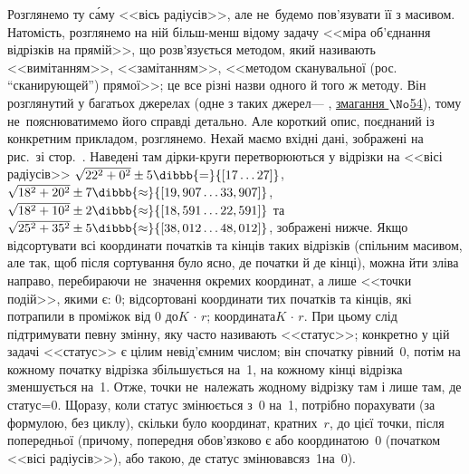 Розглянемо ту с\'{а}му <<вісь радіусів>>, але не~будемо пов'язувати її з масивом. Натомість, розглянемо на ній більш-менш відому задачу <<міра об'єднання відрізків на прямій>>, що розв'язується методом, який називають <<вимітанням>>, <<замітанням>>, <<методом сканувальної (рос. ``сканирующей'') прямої>>; це все різні назви одного й того ж методу. Він розглянутий у багатьох джерелах (одне з таких джерел\nolinebreak[3] --- \EjudgeCkipoName, \href{https://ejudge.ckipo.edu.ua/cgi-bin/new-register?contest_id=54}{змагання $\No$54}), тому не~пояснюватимемо його справді детально. Але короткий опис, поєднаний із конкретним прикладом, розглянемо. Нехай маємо вхідні дані, зображені на рис.\ зі стор.~\pageref{fig:202021-oioi-D-example-when-non-overlapping-disks-map-to-overlapping-segments}. Наведені там дірки-круги перетворюються у відрізки на <<\mbox{вісі} радіусів>>\hspace{0.125em plus 0.5em} 
${\sqrt{22^2+0^2}\pm 5}\dibbb{{=}}{[17\ldots27]}$,\hspace{0.125em plus 0.5em}
${\sqrt{18^2+20^2}\pm 7}\dibbb{{\approx}}{[19,907\ldots33,907]}$,\hspace{0.125em plus 0.5em}
${\sqrt{18^2+10^2}\pm 2}\dibbb{{\approx}}{[18,591\ldots22,591]}$\hspace{0.125em plus 0.5em} та\hspace{0.125em plus 0.5em}
${\sqrt{25^2+35^2}\pm 5}\dibbb{{\approx}}{[38,012\ldots48,012]}$,\hspace{0.125em plus 0.5em}
зображені нижче.
Якщо відсортувати всі координати початків та кінців таких відрізків (спільним масивом, але так, щоб після сортування було ясно, де початки й де кінці), можна йти зліва направо, перебираючи не~значення окремих координат, а лише <<точки подій>>, якими є: 0; відсортовані координати тих початків та кінців, які потрапили в проміжок від 0 до\nolinebreak[2] ${K\,{\cdot}\,r}$; координата\nolinebreak[2] ${K\,{\cdot}\,r}$.
При цьому слід підтримувати певну змінну, яку часто називають <<статус>>; конкретно у цій задачі <<статус>> є цілим невід'ємним числом; він спочатку рівний~0, потім на кожному початку відрізка збільшується на~1, на кожному кінці відрізка зменшується на~1. Отже, точки не~належать жодному відрізку там і лише там, де статус=0.
Щоразу, коли статус змінюється з~0 на~1, потрібно порахувати (за формулою, без циклу), скільки було координат, кратних~$r$, до цієї точки, після попередньої (причому, попередня обов'язково є або координатою~0 (початком <<вісі радіусів>>), або такою, де статус змінювався\nolinebreak[2] з~1\nolinebreak[2] на~0).

 